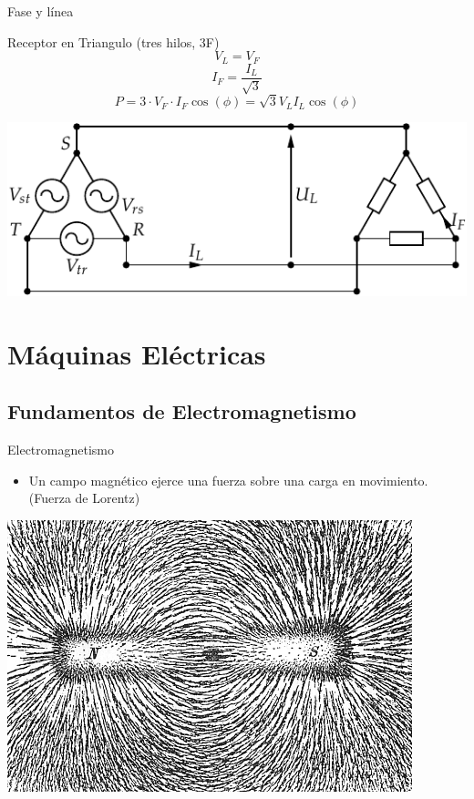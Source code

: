 \documentclass[xcolor={usenames,svgnames,dvipsnames}]{beamer}
\begin{document}
\begin{frame}[label={sec:org8c4bb71}]{Fase y línea}
\begin{block}{Receptor en Triangulo (tres hilos, 3F)}
$$V_{L}=V_{F}$$ $$I_{F}=\frac{I_{L}}{\sqrt{3}}$$
$$P=3\cdot V_{F}\cdot I_{F}\cos(\phi)=\sqrt{3}V_{L}I_{L}\cos(\phi)$$
\begin{center}
\includegraphics[width=.9\linewidth]{../figs/RedTrifasicaTriangulo.pdf}
\end{center}
\end{block}
\end{frame}

\section{Máquinas Eléctricas}
\label{sec:orgbbb6615}

\subsection{Fundamentos de Electromagnetismo}
\label{sec:org51be9d5}

\begin{frame}[label={sec:org8176e6e}]{Electromagnetismo}
\begin{itemize}
\item Un campo magnético ejerce una fuerza sobre una carga en movimiento.
(Fuerza de Lorentz)
\end{itemize}

\begin{center}
\includegraphics[width=.9\linewidth]{../figs/Magnet0873.png}
\end{center}
\end{frame}
\end{document}
